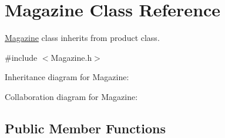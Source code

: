 \hypertarget{classMagazine}{}\section{Magazine Class Reference}
\label{classMagazine}


\hyperlink{classMagazine}{Magazine} class inherits from product class.  




{\ttfamily \#include $<$Magazine.\+h$>$}



Inheritance diagram for Magazine\+:


Collaboration diagram for Magazine\+:
\subsection*{Public Member Functions}
